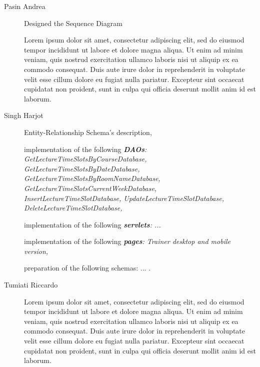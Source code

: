 \begin{description}
	\item[Pasin Andrea] 
	Designed the Sequence Diagram
	
	Lorem ipsum dolor sit amet, consectetur adipiscing elit, sed do eiusmod tempor incididunt ut labore et dolore magna aliqua. Ut enim ad minim veniam, quis nostrud exercitation ullamco laboris nisi ut aliquip ex ea commodo consequat. Duis aute irure dolor in reprehenderit in voluptate velit esse cillum dolore eu fugiat nulla pariatur. Excepteur sint occaecat cupidatat non proident, sunt in culpa qui officia deserunt mollit anim id est laborum.
	\item[Singh Harjot] Entity-Relationship Schema's description,
	
	implementation of the following \textit{\textbf{DAOs}:
		GetLectureTimeSlotsByCourseDatabase,
		GetLectureTimeSlotsByDateDatabase,
		GetLectureTimeSlotsByRoomNameDatabase,
		GetLectureTimeSlotsCurrentWeekDatabase,
		InsertLectureTimeSlotDatabase,
		UpdateLectureTimeSlotDatabase,
		DeleteLectureTimeSlotDatabase,
	}
	
	implementation of the following \textit{\textbf{servlets}: 
		... 
	}
	
	implementation of the following \textit{\textbf{pages}: 
		Trainer desktop and mobile version,
	}
	
	preparation of the following schemas: ... .
	\item[Tumiati Riccardo] Lorem ipsum dolor sit amet, consectetur adipiscing elit, sed do eiusmod tempor incididunt ut labore et dolore magna aliqua. Ut enim ad minim veniam, quis nostrud exercitation ullamco laboris nisi ut aliquip ex ea commodo consequat. Duis aute irure dolor in reprehenderit in voluptate velit esse cillum dolore eu fugiat nulla pariatur. Excepteur sint occaecat cupidatat non proident, sunt in culpa qui officia deserunt mollit anim id est laborum.
\end{description}